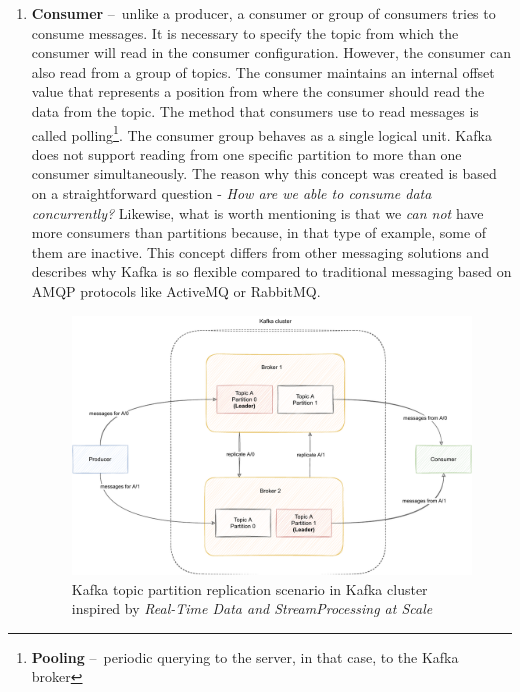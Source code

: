 \begin{enumerate}
    \item \textbf{Consumer} \---\ unlike a producer, a consumer or group of consumers tries to consume messages.
    It is necessary to specify the topic from which the consumer will read in the consumer configuration.
    However, the consumer can also read from a group of topics.
    The consumer maintains an internal offset value that represents a position from where the consumer should read the data from the topic.
    The method that consumers use to read messages is called polling\footnote{\textbf{Pooling} \---\ periodic querying to the server, in that case, to the Kafka broker}.
    The consumer group behaves as a single logical unit.
    Kafka does not support reading from one specific partition to more than one consumer simultaneously.
    The reason why this concept was created is based on a straightforward question - \emph{How are we able to consume data concurrently?} Likewise, what is worth mentioning is that we \emph{can not} have more consumers than partitions because, in that type of example, some of them are inactive.
    This concept differs from other messaging solutions and describes why Kafka is so flexible compared to traditional messaging based on AMQP protocols like ActiveMQ or RabbitMQ.

    \begin{figure}[!ht]
        \centering
        \includegraphics[scale=0.65]{obrazky-figures/02-preliminaries/02-kafka/05-replication-of-partitions}
        \caption{Kafka topic partition replication scenario in Kafka cluster inspired by \emph{Real-Time Data and StreamProcessing at Scale} \cite{apacheKafkaDefinitiveGuide}}
        \label{02:fig:replicationOfTopicPartition}
    \end{figure}


\end{enumerate}
